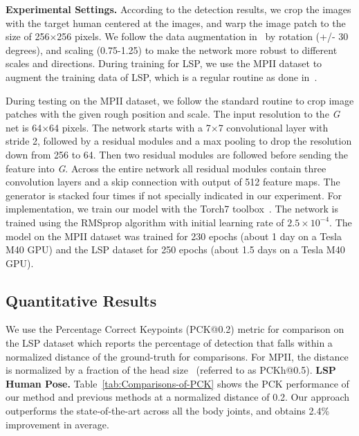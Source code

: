 \documentclass[10pt,letterpaper,twocolumn]{article}
\begin{document}
\noindent \textbf{Experimental Settings.} According to the detection results, we crop the images with the target human centered at the
images, and warp the image patch to the size of 256$\times$256 pixels. We follow the data augmentation in~\cite{conf/eccv/NewellYD16} by rotation (+/- 30 degrees), and scaling (0.75-1.25) to make the network more robust to different scales and directions. During training for LSP, we use the MPII dataset to augment the training data of LSP, which is a regular routine as done in~\cite{conf/cvpr/WeiRKS16,conf/eccv/InsafutdinovPAA16}.

During testing on the MPII dataset, we follow the standard routine to crop image patches with the given rough position and scale.
The input resolution to the \textit{G} net is 64$\times$64 pixels. The network starts with a 7$\times$7 convolutional layer with stride 2, followed by a residual modules and a max pooling to drop the resolution down from 256 to 64. Then two residual modules are followed before sending the feature into \textit{G}. Across the entire network all residual modules contain three convolution layers and a skip connection with output of 512 feature maps. The generator is stacked four times if not specially indicated in our experiment. For implementation, we train our model with the Torch7 toolbox~\cite{conf/nips/torch7}. The network is trained using the RMSprop algorithm with initial learning rate of $2.5\times 10 ^{-4}$. The model on the MPII dataset was trained for 230 epochs (about 1 day on a Tesla M40 GPU) and the LSP dataset for 250 epochs (about 1.5 days on a Tesla M40 GPU).

\subsection{Quantitative Results}\label{subsec:Results}

We use the Percentage Correct Keypoints (PCK@0.2) \cite{yang2013articulated} metric for comparison on the LSP dataset which reports the percentage of detection that falls within a normalized distance of the ground-truth for comparisons. For MPII, the distance is normalized by a fraction of the head size~\cite{conf/cvpr/AndrilukaPGS14} (referred to as PCKh@0.5). 
\noindent \textbf{LSP Human Pose.} Table~\ref{tab:Comparisons-of-PCK} shows the PCK performance of our method and previous methods at a normalized distance of 0.2. Our approach outperforms the state-of-the-art across all the body joints, and obtains 2.4\% improvement in average.
\end{document}
